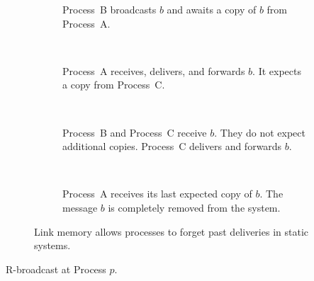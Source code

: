 \begin{figure}
  \begin{center}
    \begin{subfigure}[t]{0.23\textwidth}
      \centering%
      \caption{\label{fig:memorylinkA}Process~B broadcasts $b$ and awaits a copy
        of $b$ from Process~A.}
    \end{subfigure}
    ~
    \begin{subfigure}[t]{0.23\textwidth}
      \centering%
      \caption{\label{fig:memorylinkB}Process~A receives, delivers, and forwards
        $b$. It expects a copy from Process~C.}
    \end{subfigure}
    ~
    \begin{subfigure}[t]{0.23\textwidth}
      \centering%
      \caption{\label{fig:memorylinkC}Process~B and Process~C receive $b$. They
        do not expect additional copies. Process~C delivers and forwards $b$.}
    \end{subfigure}
    ~
    \begin{subfigure}[t]{0.23\textwidth}
      \centering%
      \caption{\label{fig:memorylinkD}Process~A receives its last expected copy
        of $b$. The message $b$ is completely removed from the system.}
    \end{subfigure}
    \caption{\label{fig:memorylink}Link memory allows processes to forget past
      deliveries in static systems.}
  \end{center}
\end{figure}

\begin{algorithm}[h]
  
  \caption{\label{algo:reliablebroadcast}R-broadcast at Process $p$.}
\end{algorithm}


